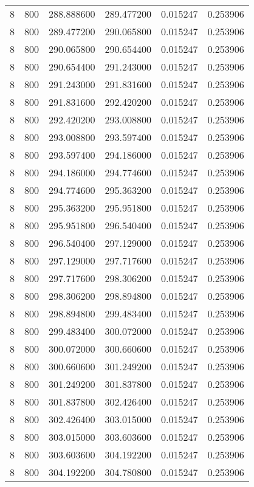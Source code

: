 \begin{longtable}{rrrrrr}
8 & 800 & 288.888600 & 289.477200 & 0.015247 & 0.253906 \\
8 & 800 & 289.477200 & 290.065800 & 0.015247 & 0.253906 \\
8 & 800 & 290.065800 & 290.654400 & 0.015247 & 0.253906 \\
8 & 800 & 290.654400 & 291.243000 & 0.015247 & 0.253906 \\
8 & 800 & 291.243000 & 291.831600 & 0.015247 & 0.253906 \\
8 & 800 & 291.831600 & 292.420200 & 0.015247 & 0.253906 \\
8 & 800 & 292.420200 & 293.008800 & 0.015247 & 0.253906 \\
8 & 800 & 293.008800 & 293.597400 & 0.015247 & 0.253906 \\
8 & 800 & 293.597400 & 294.186000 & 0.015247 & 0.253906 \\
8 & 800 & 294.186000 & 294.774600 & 0.015247 & 0.253906 \\
8 & 800 & 294.774600 & 295.363200 & 0.015247 & 0.253906 \\
8 & 800 & 295.363200 & 295.951800 & 0.015247 & 0.253906 \\
8 & 800 & 295.951800 & 296.540400 & 0.015247 & 0.253906 \\
8 & 800 & 296.540400 & 297.129000 & 0.015247 & 0.253906 \\
8 & 800 & 297.129000 & 297.717600 & 0.015247 & 0.253906 \\
8 & 800 & 297.717600 & 298.306200 & 0.015247 & 0.253906 \\
8 & 800 & 298.306200 & 298.894800 & 0.015247 & 0.253906 \\
8 & 800 & 298.894800 & 299.483400 & 0.015247 & 0.253906 \\
8 & 800 & 299.483400 & 300.072000 & 0.015247 & 0.253906 \\
8 & 800 & 300.072000 & 300.660600 & 0.015247 & 0.253906 \\
8 & 800 & 300.660600 & 301.249200 & 0.015247 & 0.253906 \\
8 & 800 & 301.249200 & 301.837800 & 0.015247 & 0.253906 \\
8 & 800 & 301.837800 & 302.426400 & 0.015247 & 0.253906 \\
8 & 800 & 302.426400 & 303.015000 & 0.015247 & 0.253906 \\
8 & 800 & 303.015000 & 303.603600 & 0.015247 & 0.253906 \\
8 & 800 & 303.603600 & 304.192200 & 0.015247 & 0.253906 \\
8 & 800 & 304.192200 & 304.780800 & 0.015247 & 0.253906 \\

\end{longtable}
